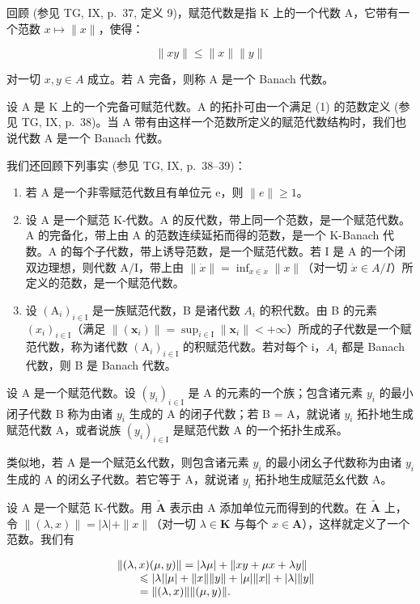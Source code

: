 回顾 (参见 TG, IX, p.~37, 定义 9)，赋范代数是指 K 上的一个代数 A，它带有一个范数 \(x \mapsto \|x\|\)，使得：

\[
\| x y \| \leqslant \| x \| \| y \|\tag{1}
\]

对一切 \(x, y \in A\) 成立。若 A 完备，则称 A 是一个 Banach 代数。

设 A 是 K 上的一个完备可赋范代数。A 的拓扑可由一个满足 (1) 的范数定义 (参见 TG, IX, p.~38)。当 A 带有由这样一个范数所定义的赋范代数结构时，我们也说代数 A 是一个 Banach 代数。

我们还回顾下列事实 (参见 TG, IX, p.~38--39)：

\begin{enumerate}
\def\labelenumi{(\arabic{enumi})}
\item
  若 A 是一个非零赋范代数且有单位元 e，则 \(\|e\|\geqslant1\)。
\item
  设 A 是一个赋范 K-代数。A 的反代数，带上同一个范数，是一个赋范代数。A 的完备化，带上由 A 的范数连续延拓而得的范数，是一个 K-Banach 代数。A 的每个子代数，带上诱导范数，是一个赋范代数。若 I 是 A 的一个闭双边理想，则代数 A/I，带上由 \(\|\dot{x}\| = \inf_{x \in \dot{x}} \|x\|\)（对一切 \(\dot{x} \in A/I\)）所定义的范数，是一个赋范代数。
\item
  设 \((\mathrm{A}_{i})_{i\in\mathrm{I}}\) 是一族赋范代数，B 是诸代数 \(A_{i}\) 的积代数。由 B 的元素 \((x_{i})_{i\in\mathrm{I}}\)（满足 \(\|(\boldsymbol{x}_{i})\|=\sup_{i\in\mathrm{I}}\|\boldsymbol{x}_{i}\|<+\infty\)）所成的子代数是一个赋范代数，称为诸代数 \((\mathrm{A}_{i})_{i\in\mathrm{I}}\) 的积赋范代数。若对每个 i，\(A_{i}\) 都是 Banach 代数，则 B 是 Banach 代数。
\end{enumerate}

设 A 是一个赋范代数。设 \((y_{i})_{i\in\mathrm{I}}\) 是 A 的元素的一个族；包含诸元素 \(y_{i}\) 的最小闭子代数 B 称为由诸 \(y_{i}\) 生成的 A 的闭子代数；若 B = A，就说诸 \(y_{i}\) 拓扑地生成赋范代数 A，或者说族 \((y_{i})_{i\in\mathrm{I}}\) 是赋范代数 A 的一个拓扑生成系。

类似地，若 A 是一个赋范幺代数，则包含诸元素 \(y_{i}\) 的最小闭幺子代数称为由诸 \(y_{i}\) 生成的 A 的闭幺子代数。若它等于 A，就说诸 \(y_{i}\) 拓扑地生成赋范幺代数 A。

设 A 是一个赋范 K-代数。用 \(\tilde{\mathbf{A}}\) 表示由 A 添加单位元而得到的代数。在 \(\tilde{\mathbf{A}}\) 上，令 \(\| (\lambda ,x)\| = |\lambda | + \| x\|\)（对一切 \(\lambda \in \mathbf{K}\) 与每个 \(x\in \mathbf{A}\)），这样就定义了一个范数。我们有

\[
\begin{array}{r l} & {\| (\lambda , x) (\mu , y) \| = | \lambda \mu | + \| x y + \mu x + \lambda y \|} \\ & {\qquad \leqslant | \lambda | | \mu | + \| x \| \| y \| + | \mu | \| x \| + | \lambda | \| y \|} \\ & {\qquad = \| (\lambda , x) \| \| (\mu , y) \|.} \end{array}
\]

